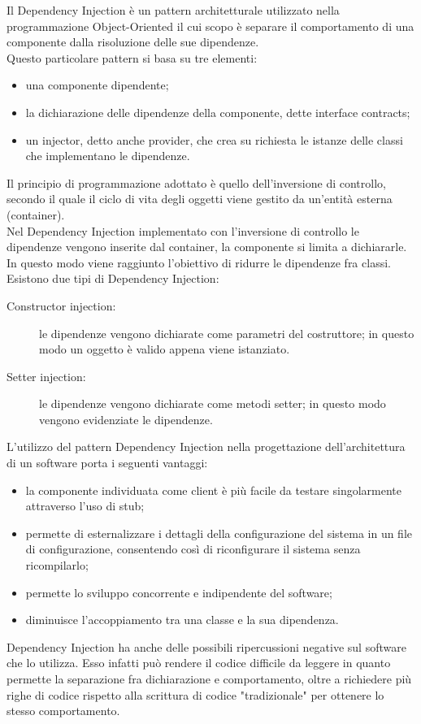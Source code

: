 	 \label{app:dependencyinjection}
Il Dependency Injection è un pattern architetturale utilizzato nella programmazione Object-Oriented il cui scopo è separare il comportamento di una componente dalla risoluzione delle sue dipendenze. \\
Questo particolare pattern si basa su tre elementi:
\begin{itemize}
\item una componente dipendente;
\item la dichiarazione delle dipendenze della componente, dette interface contracts;
\item un injector, detto anche provider, che crea su richiesta le istanze delle classi che implementano le dipendenze.
\end{itemize}
Il principio di programmazione adottato è quello dell'inversione di controllo, secondo il quale il ciclo di vita degli oggetti viene gestito da un'entità esterna (container).\\
Nel Dependency Injection implementato con l'inversione di controllo le dipendenze vengono inserite dal container, la componente si limita a dichiararle. In questo modo viene raggiunto l'obiettivo di ridurre le dipendenze fra classi.\\
Esistono due tipi di Dependency Injection:
\begin{description}
	\item[Constructor injection:] le dipendenze vengono dichiarate come parametri del costruttore; in questo modo un oggetto è valido appena viene istanziato.
	\item[Setter injection:] le dipendenze vengono dichiarate come metodi setter; in questo modo vengono evidenziate le dipendenze.
\end{description}

L'utilizzo del pattern Dependency Injection nella progettazione dell'architettura di un software porta i seguenti vantaggi:
\begin{itemize}
\item la componente individuata come client è più facile da testare singolarmente attraverso l'uso di stub;
\item permette di esternalizzare i dettagli della configurazione del sistema in un file di configurazione, consentendo così di riconfigurare il sistema senza ricompilarlo;
\item permette lo sviluppo concorrente e indipendente del software;
\item diminuisce l'accoppiamento tra una classe e la sua dipendenza.
\end{itemize}
Dependency Injection ha anche delle possibili ripercussioni negative sul software che lo utilizza. Esso infatti può rendere il codice difficile da leggere in quanto permette la separazione fra dichiarazione e comportamento, oltre a richiedere più righe di codice rispetto alla scrittura di codice "tradizionale" per ottenere lo stesso comportamento.